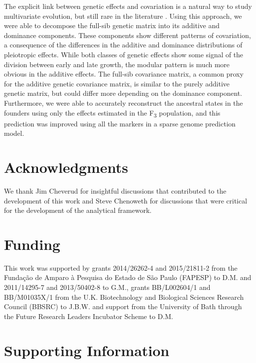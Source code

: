\begin{refsection}
The explicit link between genetic effects and covariation is a natural
way to study multivariate evolution, but still rare in the literature \parencite{Kelly2009-bj}.
Using this approach, we were able to decompose the full-sib genetic matrix into its
additive and dominance components. These components show different
patterns of covariation, a consequence of the differences in the
additive and dominance distributions of pleiotropic effects. While both
classes of genetic effects show some signal of the division between
early and late growth, the modular pattern is much more obvious in the
additive effects. The full-sib covariance matrix, a common proxy for the
additive genetic covariance matrix, is similar to the purely additive
genetic matrix, but could differ more depending on the dominance
component. Furthermore, we were able to accurately reconstruct the
ancestral states in the founders using only the effects estimated in
the F\textsubscript{3} population, and this prediction was improved using all the
markers in a sparse genome prediction model.


\section{Acknowledgments}

We thank Jim Cheverud for insightful discussions that contributed to the
development of this work and Steve Chenoweth for discussions that were
critical for the development of the analytical framework.


\section{Funding}

This work was supported by grants 2014/26262-4 and 2015/21811-2 from the
Fundação de Amparo à Pesquisa do Estado de São Paulo (FAPESP) to D.M.
and 2011/14295-7 and 2013/50402-8 to G.M., grants BB/L002604/1 and
BB/M01035X/1 from the U.K. Biotechnology and Biological Sciences
Research Council (BBSRC) to J.B.W. and support from the University of
Bath through the Future Research Leaders Incubator Scheme to D.M.

\printbibliography

\newpage

\section*{Supporting Information}

\makeatletter
\renewcommand{\thefigure}{S\arabic{chapter}.\arabic{figure}}
\makeatother


\end{refsection}
